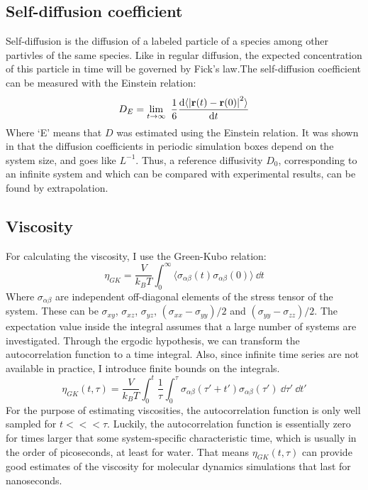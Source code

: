 \subsection{Self-diffusion coefficient}
Self-diffusion is the diffusion of a labeled particle of a species among other partivles of the same species. Like in regular diffusion, the expected concentration of this particle in time will be governed by Fick's law.The self-diffusion coefficient can be measured with the Einstein relation:
\begin{equation}
	D_E = \lim_{t\to\infty} \frac{1}{6} \frac{\dd \langle \left|\rvec(t) - \rvec(0)\right|^2\rangle}{\dd t}
	\label{eq:Einstein_diffusivity}
\end{equation}
Where `E' means that $D$ was estimated using the Einstein relation. It was shown in \cite{Yeh2004} that the diffusion coefficients in periodic simulation boxes depend on the system size, and goes like $L^{-1}$. Thus, a reference diffusivity $D_0$, corresponding to an infinite system and which can be compared with experimental results, can be found by extrapolation.

\subsection{Viscosity}
For calculating the viscosity, I use the Green-Kubo relation:
\begin{equation}
	\eta_{GK} = \frac{V}{k_B T} \int_0^\infty \langle \sigma_{\alpha\beta}(t) \sigma_{\alpha\beta}(0) \rangle\ \dd t
	\label{eq:GK_shear_viscosity}
\end{equation}
Where $\sigma_{\alpha\beta}$ are independent off-diagonal elements of the stress tensor of the system. These can be $\sigma_{xy}$, $\sigma_{xz}$, $\sigma_{yz}$, $(\sigma_{xx}-\sigma_{yy})/2$ and $(\sigma_{yy}-\sigma_{zz})/2$. The expectation value inside the integral assumes that a large number of systems are investigated. Through the ergodic hypothesis, we can transform the autocorrelation function to a time integral. Also, since infinite time series are not available in practice, I introduce finite bounds on the integrals. 
\begin{equation}
	\eta_{GK}(t, \tau) = \frac{V}{k_B T} \int_0^t  \frac{1}{\tau} \int_0^\tau \sigma_{\alpha\beta}(\tau'+t') \sigma_{\alpha\beta}(\tau')\ \dd \tau'\ \dd t' 
\label{eq:GK_shear_viscosity_estimate}
\end{equation}
For the purpose of estimating viscosities, the autocorrelation function is only well sampled for $t <<< \tau$. Luckily, the autocorrelation function is essentially zero for times larger that some system-specific characteristic time, which is usually in the order of picoseconds, at least for water. That means $\eta_{GK}(t, \tau)$ can provide good estimates of the viscosity for molecular dynamics simulations that last for nanoseconds.


